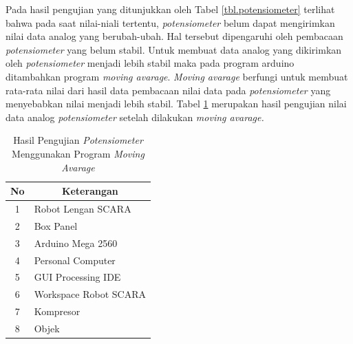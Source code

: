 Pada hasil pengujian yang ditunjukkan oleh Tabel \ref{tbl.potensiometer} terlihat bahwa pada saat nilai-niali tertentu, \textit{potensiometer} belum dapat mengirimkan nilai data analog yang berubah-ubah. Hal tersebut dipengaruhi oleh pembacaan \textit{potensiometer} yang belum stabil. Untuk membuat data analog yang dikirimkan oleh \textit{potensiometer} menjadi lebih stabil maka pada program arduino ditambahkan program \textit{moving avarage}. \textit{Moving avarage} berfungi untuk membuat rata-rata nilai dari hasil data pembacaan nilai data pada \textit{potensiometer} yang menyebabkan nilai menjadi lebih stabil. Tabel \ref{tbl.potensiometer2} merupakan hasil pengujian nilai data analog \textit{potensiometer} setelah dilakukan \textit{moving avarage.}

\begin{table}[H]
	\centering
	\caption{Hasil Pengujian \textit{Potensiometer} Menggunakan Program \textit{Moving Avarage}}
	\label{tbl.potensiometer2}
	\begin{tabular}{|c|l|}
		\hline
		\rowcolor[HTML]{9B9B9B} 
		
		No & \multicolumn{1}{c|}{\cellcolor[HTML]{9B9B9B}Keterangan} \\ \hline
		1  & Robot Lengan SCARA                                      \\ \hline
		2  & Box Panel                                               \\ \hline
		3  & Arduino Mega 2560                                       \\ \hline
		4  & Personal Computer                                       \\ \hline
		5  & GUI Processing IDE                                      \\ \hline
		6  & Workspace Robot SCARA                                   \\ \hline
		7  & Kompresor                                               \\ \hline
		8  & Objek                                                   \\ \hline
	\end{tabular}
	
\end{table} 

